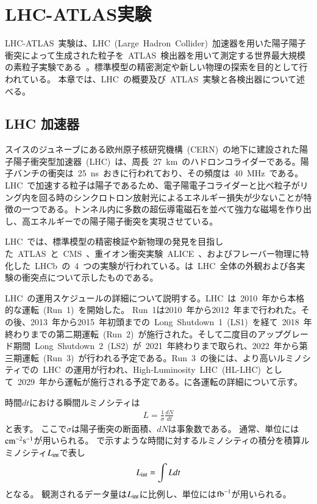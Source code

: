 \chapter{LHC-ATLAS実験}
\thispagestyle{empty}
\label{chap:2}
LHC-ATLAS~実験は、LHC~(Large~Hadron~Collider)~加速器を用いた陽子陽子衝突によって生成された粒子を~ATLAS~検出器を用いて測定する世界最大規模の素粒子実験である~\cite{TR:01}。標準模型の精密測定や新しい物理の探索を目的として行われている。
本章では、LHC~の概要及び~ATLAS~実験と各検出器について述べる。

\section{LHC 加速器}
スイスのジュネーブにある欧州原子核研究機構~(CERN)~の地下に建設された陽子陽子衝突型加速器~(LHC)~は、周長~27~km~のハドロンコライダーである。陽子バンチの衝突は~25~ns~おきに行われており、その頻度は~40~MHz~である。LHC~で加速する粒子は陽子であるため、電子陽電子コライダーと比べ粒子がリング内を回る時のシンクロトロン放射光によるエネルギー損失が少ないことが特徴の一つである。トンネル内に多数の超伝導電磁石を並べて強力な磁場を作り出し、高エネルギーでの陽子陽子衝突を実現させている。

LHC~では、標準模型の精密検証や新物理の発見を目指した~ATLAS~\cite{URL:13}と~CMS~\cite{URL:14}、重イオン衝突実験~ALICE~\cite{URL:15}、およびフレーバー物理に特化した~LHCb~\cite{URL:16}の~4~つの実験が行われている。は~LHC~全体の外観および各実験の衝突点について示したものである。

LHC~の運用スケジュールの詳細について説明する。LHC~は~2010~年から本格的な運転~(Run~1)~を開始した。
Run~1は2010~年から2012~年まで行われた。その後、2013~年から2015~年初頭までの~Long~Shutdown~1~(LS1)~を経て~2018~年終わりまでの第二期運転~(Run~2)~が施行された。そして二度目のアップグレード期間~Long~Shutdown~2~(LS2)~が~2021~年終わりまで取られ、2022~年から第三期運転~(Run~3)~が行われる予定である。Run~3~の後には、より高いルミノシティでの~LHC~の運用が行われ、High-Luminosity~LHC~(HL-LHC)~として~2029~年から運転が施行される予定である。に各運転の詳細について示す。

時間$dt$における瞬間ルミノシティは
\begin{align}
    L = \frac{1}{\sigma}\frac{dN}{dt} \label{eq:lumi}
\end{align}
と表す。
ここで$\sigma$は陽子衝突の断面積、$dN$は事象数である。
通常、単位には$\rm{cm}^{-2}\rm{s}^{-1}$が用いられる。
で示すような時間に対するルミノシティの積分を積算ルミノシティ$L_{\rm{int}}$で表し
\begin{align}
    L_{\rm{int}} = \int{Ldt} \label{eq:ilumi}
\end{align}
となる。
観測されるデータ量は$L_{\rm{int}}$に比例し、単位には$\rm{fb}^{-1}$が用いられる。

